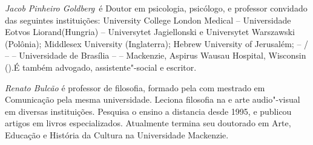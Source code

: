 \emph{Jacob Pinheiro Goldberg}~é Doutor em psicologia, psicólogo, e
professor convidado das seguintes instituições:
University College London Medical -- Universidade Eotvos
Liorand(Hungria) -- Universytet Jagiellonski e Universytet Warszawski
(Polônia); Middlesex University (Inglaterra); Hebrew University of
Jerusalém;  -- / --  -- Universidade de Brasília --  --
Mackenzie, Aspirus Wausau Hospital, Wisconsin ().É também
advogado, assistente"-social e escritor.

\emph{Renato Bulcão} é professor de filosofia, formado pela  com
mestrado em Comunicação pela mesma universidade. Leciona filosofia na
 e arte audio"-visual em diversas instituições. Pesquisa o ensino a
distancia desde 1995, e publicou artigos em livros especializados.
Atualmente termina seu doutorado em Arte, Educação e História da Cultura
na Universidade Mackenzie.

